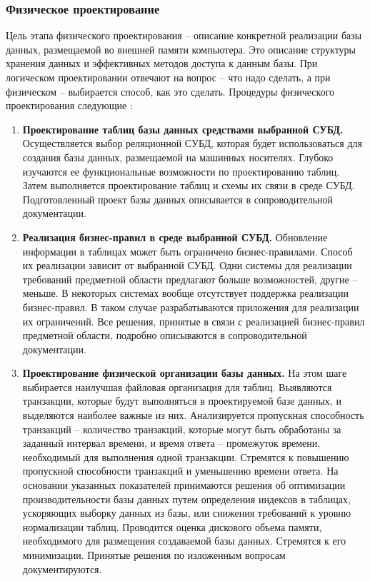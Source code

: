 \subsubsection{Физическое проектирование}

Цель этапа физического проектирования – описание конкретной реализации базы данных, размещаемой во внешней
памяти компьютера. Это описание структуры хранения данных и эффективных методов доступа к данным базы. При
логическом проектировании отвечают на вопрос – что надо сделать, а при физическом – выбирается способ, как
это сделать. Процедуры физического проектирования следующие \autocite{design-db_6}:
\begin{enumerate}
    \item \textbf{Проектирование таблиц базы данных средствами выбранной СУБД.}
        Осуществляется выбор реляционной СУБД, которая будет использоваться для создания базы данных,
        размещаемой на машинных носителях. Глубоко изучаются ее функциональные возможности по проектированию
        таблиц. Затем выполняется проектирование таблиц и схемы их связи в среде СУБД. Подготовленный проект
        базы данных описывается в сопроводительной документации.

    \item \textbf{Реализация бизнес-правил в среде выбранной СУБД.}
        Обновление информации в таблицах может быть ограничено бизнес-правилами. Способ их реализации
        зависит от выбранной СУБД. Одни системы для реализации требований предметной области предлагают
        больше возможностей, другие – меньше. В некоторых системах вообще отсутствует поддержка реализации
        бизнес-правил. В таком случае разрабатываются приложения для реализации их ограничений. Все решения,
        принятые в связи с реализацией бизнес-правил предметной области, подробно описываются в сопроводительной
        документации.

    \item \textbf{Проектирование физической организации базы данных.}
        На этом шаге выбирается наилучшая файловая организация для таблиц. Выявляются транзакции, которые
        будут выполняться в проектируемой базе данных, и выделяются наиболее важные из них. Анализируется
        пропускная способность транзакций – количество транзакций, которые могут быть обработаны за заданный
        интервал времени, и время ответа – промежуток времени, необходимый для выполнения одной транзакции.
        Стремятся к повышению пропускной способности транзакций и уменьшению времени ответа. На основании указанных
        показателей принимаются решения об оптимизации производительности базы данных путем определения индексов
        в таблицах, ускоряющих выборку данных из базы, или снижения требований к уровню нормализации таблиц.
        Проводится оценка дискового объема памяти, необходимого для размещения создаваемой базы данных.
        Стремятся к его минимизации. Принятые решения по изложенным вопросам документируются.


\end{enumerate}
